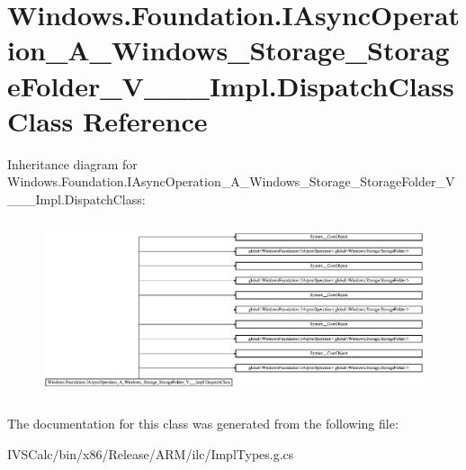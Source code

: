 \hypertarget{class_windows_1_1_foundation_1_1_i_async_operation___a___windows___storage___storage_folder___v_______impl_1_1_dispatch_class}{}\section{Windows.\+Foundation.\+I\+Async\+Operation\+\_\+\+A\+\_\+\+Windows\+\_\+\+Storage\+\_\+\+Storage\+Folder\+\_\+\+V\+\_\+\+\_\+\+\_\+\+Impl.\+Dispatch\+Class Class Reference}
\label{class_windows_1_1_foundation_1_1_i_async_operation___a___windows___storage___storage_folder___v_______impl_1_1_dispatch_class}
Inheritance diagram for Windows.\+Foundation.\+I\+Async\+Operation\+\_\+\+A\+\_\+\+Windows\+\_\+\+Storage\+\_\+\+Storage\+Folder\+\_\+\+V\+\_\+\+\_\+\+\_\+\+Impl.\+Dispatch\+Class\+:\begin{figure}[H]
\begin{center}
\leavevmode
\includegraphics[height=5.211506cm]{class_windows_1_1_foundation_1_1_i_async_operation___a___windows___storage___storage_folder___v_______impl_1_1_dispatch_class}
\end{center}
\end{figure}


The documentation for this class was generated from the following file\+:\begin{DoxyCompactItemize}
\item 
I\+V\+S\+Calc/bin/x86/\+Release/\+A\+R\+M/ilc/Impl\+Types.\+g.\+cs\end{DoxyCompactItemize}

